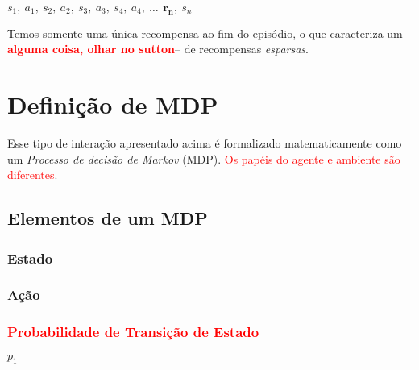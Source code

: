 \documentclass{article}
\newcommand{\todo}[1]{ --\textcolor{red}{\textbf{#1}}--}
\begin{document}
            \begin{center}
                $s_1,\ a_1,\ s_2,\ a_2,\ s_3,\ a_3,\ s_4,\ a_4,\ \dots\,\ \boxed{\mathbf{r_n}},\ s_n$
            \end{center}
            
            Temos somente uma única recompensa ao fim do episódio, o que caracteriza um \todo{alguma coisa, olhar no sutton} de recompensas \emph{esparsas}.

            
    \section{Definição de MDP}
    
        Esse tipo de interação apresentado acima é formalizado matematicamente como um \emph{Processo de decisão de Markov} (MDP). \textcolor{red}{Os papéis do agente e ambiente são diferentes}.
    
        \subsection{Elementos de um MDP}
    
            \subsubsection{Estado}
            
                
            \subsubsection{Ação}
            
                
            \subsubsection{\textcolor{red}{Probabilidade de Transição de Estado}}
            
                $p_1$ \\
            
\end{document}
